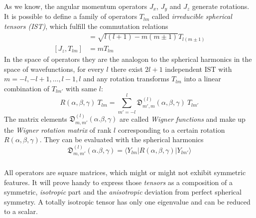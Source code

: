 \documentclass[11.5pt,a4paper]{article}
\begin{document}
As we know, the angular momentum operators $J_x$, $J_y$ and $J_z$ generate rotations. It is possible to define a family of operators $T_{lm}$ called \emph{irreducible spherical tensors (IST)}, which fulfill the commutation relations
\begin{align}
 [J_\pm,T_{lm}] & = \sqrt{l(l+1)-m(m\pm1)} T_{l(m\pm1)} \\
  [J_z, T_{lm}] & = m T_{lm}
  \label{eq-tlm-commutators}
\end{align}
In the space of operators they are the analogon to the spherical harmonics in the space of wavefunctions, for every $l$ there exist $2l+1$ independent IST with $m = -l, -l+1, \dots , l-1, l$ and any rotation transforms $T_{lm}$ into a linear combination of $T_{lm'}$ with same $l$:
\begin{equation}
 R(\alpha,\beta,\gamma) \ T_{lm} = \sum_{m'=-l}^l \mathfrak{D}_{m',m}^{(l)}(\alpha,\beta,\gamma) \ T_{lm'}
\end{equation}
The matrix elements $\mathfrak{D}_{m,m'}^{(l)}(\alpha.\beta,\gamma)$ are called \emph{Wigner functions} and make up the \emph{Wigner rotation matrix} of rank $l$ corresponding to a certain rotation $R(\alpha,\beta,\gamma)$. They can be evaluated with the spherical harmonics
\begin{equation}
 \mathfrak{D}_{m,m'}^{(l)}(\alpha.\beta,\gamma) = \langle Y_{lm}|R(\alpha,\beta,\gamma)|Y_{lm'} \rangle
\end{equation}





\subsubsection{}
All operators are square matrices, which might or might not exhibit symmetric features. It will prove handy to express those \emph{tensors} as a composition of a symmetric, \emph{isotropic} part and the \emph{anisotropic} deviation from perfect spherical symmetry. A totally isotropic tensor has only one eigenvalue and can be reduced to a scalar. 
\end{document}

